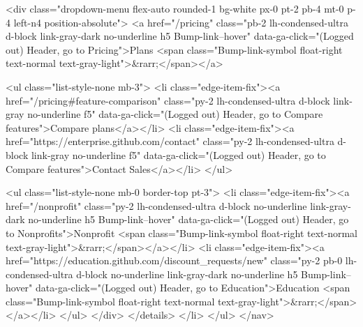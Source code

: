                   <div class="dropdown-menu flex-auto rounded-1 bg-white px-0 pt-2 pb-4 mt-0  p-4 left-n4 position-absolute">
                    <a href="/pricing" class="pb-2 lh-condensed-ultra d-block link-gray-dark no-underline h5 Bump-link--hover" data-ga-click="(Logged out) Header, go to Pricing">Plans <span class="Bump-link-symbol float-right text-normal text-gray-light">&rarr;</span></a>

                    <ul class="list-style-none mb-3">
                      <li class="edge-item-fix"><a href="/pricing#feature-comparison" class="py-2 lh-condensed-ultra d-block link-gray no-underline f5" data-ga-click="(Logged out) Header, go to Compare features">Compare plans</a></li>
                      <li class="edge-item-fix"><a href="https://enterprise.github.com/contact" class="py-2 lh-condensed-ultra d-block link-gray no-underline f5" data-ga-click="(Logged out) Header, go to Compare features">Contact Sales</a></li>
                    </ul>

                    <ul class="list-style-none mb-0  border-top pt-3">
                      <li class="edge-item-fix"><a href="/nonprofit" class="py-2 lh-condensed-ultra d-block no-underline link-gray-dark no-underline h5 Bump-link--hover" data-ga-click="(Logged out) Header, go to Nonprofits">Nonprofit <span class="Bump-link-symbol float-right text-normal text-gray-light">&rarr;</span></a></li>
                      <li class="edge-item-fix"><a href="https://education.github.com/discount_requests/new" class="py-2 pb-0 lh-condensed-ultra d-block no-underline link-gray-dark no-underline h5 Bump-link--hover"  data-ga-click="(Logged out) Header, go to Education">Education <span class="Bump-link-symbol float-right text-normal text-gray-light">&rarr;</span></a></li>
                    </ul>
                  </div>
                </details>
              </li>
          </ul>
        </nav>

